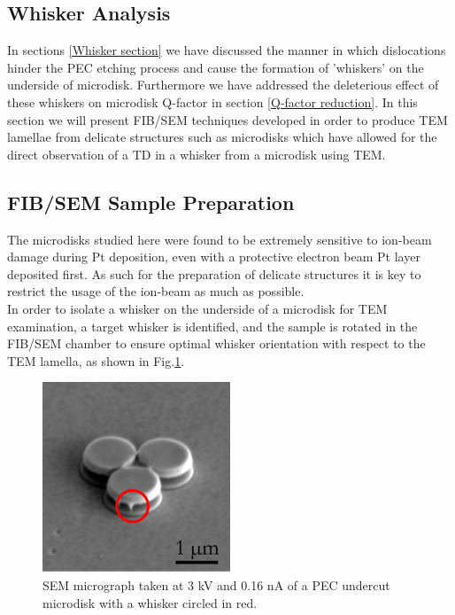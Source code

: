 \subsection{Whisker Analysis}

In sections \ref{Whisker section} we have discussed the manner in which dislocations hinder the PEC etching process and cause the formation of 'whiskers' on the underside of microdisk. Furthermore we have addressed the deleterious effect of these whiskers on microdisk Q-factor in section \ref{Q-factor reduction}. In this section we will present FIB/SEM techniques developed in order to produce TEM lamellae from delicate structures such as microdisks which have allowed for the direct observation of a TD in a whisker from a microdisk using TEM.

\subsection{FIB/SEM Sample Preparation}
\label{udiskFIBsection}
The microdisks studied here were found to be extremely sensitive to ion-beam damage during Pt deposition, even with a protective electron beam Pt layer deposited first. As such for the preparation of delicate structures it is key to restrict the usage of the ion-beam as much as possible. \\
In order to isolate a whisker on the underside of a microdisk for TEM examination, a target whisker is identified, and the sample is rotated in the FIB/SEM chamber to ensure optimal whisker orientation with respect to the TEM lamella, as shown in Fig.\ref{FIBwhisk}.

\begin{figure}[h]
	\centering
	\includegraphics[width=0.5\textwidth]{Figs/Ch4/FIBwhisk}
	\caption {SEM micrograph taken at 3 kV and 0.16 nA of a PEC undercut microdisk with a whisker circled in red.}
	\label{FIBwhisk}
\end{figure}
\FloatBarrier 

